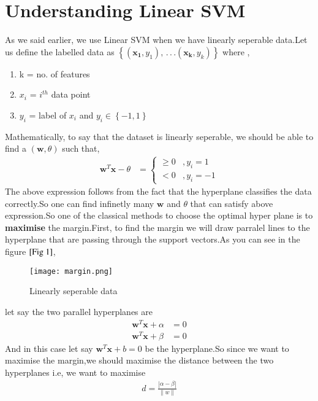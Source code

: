 \documentclass[journal,12pt,onecolumn]{IEEEtran}
\providecommand{\brak}[1]{\ensuremath{\left(#1\right)}}
\providecommand{\cbrak}[1]{\ensuremath{\left\{#1\right\}}}
\theoremstyle{remark}
\providecommand{\abs}[1]{\left\vert#1\right\vert}
\providecommand{\norm}[1]{\left\lVert#1\right\rVert}
\numberwithin{equation}{section}
\let\vec\mathbf
\begin{document}
	    \section{Understanding Linear SVM}
	    As we said earlier, we use Linear SVM when we have linearly seperable data.Let us define the labelled data as $\cbrak{\brak{\vec{x_1},y_1},\,.\,.\,.\brak{\vec{x_k},y_k}}$ where ,
	       \begin{enumerate}
	         \item k = no. of features
	         \item $x_i$ = $i^{th}$ data point
		 \item $y_i$ = label of $x_i$ and $y_i \in \cbrak{-1,1}$
	       \end{enumerate}
	 Mathematically, to say that the dataset is linearly seperable, we should be able to find a $\brak{\vec{w},\theta}$ such that,
	       \begin{align}
		      \vec{w}^T\vec{x} - \theta &= \begin{cases}
			                               \geq 0 &,y_i = 1\\
						        < 0   &, y_i = -1
					           \end{cases} 
	       \end{align}
	    The above expression follows from the fact that the hyperplane classifies the data correctly.So one can find infinetly many $\vec{w}$ and $\theta$ that can satisfy above expression.So one of the classical methods to choose the optimal hyper plane is to \textbf{maximise} the margin.First, to find the margin we will draw parralel lines to the hyperplane that are passing through the support vectors.As you can see in the figure $\ref{Fig 1}$,\\
	       \begin{figure}[h]
		\centering
		\texttt{[image: margin.png]}
		\caption{Linearly seperable data}
		\label{Fig 1}
	       \end{figure}
	    let say the two parallel hyperplanes are
	       \begin{align}
		       \vec{w}^T\vec{x} + \alpha &= 0\\
		       \vec{w}^T\vec{x} + \beta &= 0
               \end{align}
	     And in this case let say $\vec{w}^T\vec{x} + b = 0$ be the hyperplane.So since we want to maximise the margin,we should maximise the distance between the two hyperplanes i.e, we want to maximise
	       \begin{align}
		       d = \frac{\abs{\alpha - \beta}}{\norm{w}}
	       \end{align}
\end{document}
